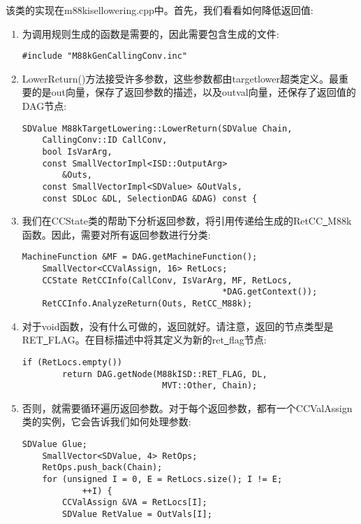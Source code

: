 该类的实现在m88kisellowering.cpp中。首先，我们看看如何降低返回值:\par

\begin{enumerate}
\item 为调用规则生成的函数是需要的，因此需要包含生成的文件:
\begin{lstlisting}[caption={}]
#include "M88kGenCallingConv.inc"
\end{lstlisting}

\item LowerReturn()方法接受许多参数，这些参数都由targetlower超类定义。最重要的是out向量，保存了返回参数的描述，以及outval向量，还保存了返回值的DAG节点:
\begin{lstlisting}[caption={}]
SDValue M88kTargetLowering::LowerReturn(SDValue Chain,
	CallingConv::ID CallConv,
	bool IsVarArg,
	const SmallVectorImpl<ISD::OutputArg>
		&Outs,
	const SmallVectorImpl<SDValue> &OutVals,
	const SDLoc &DL, SelectionDAG &DAG) const {
\end{lstlisting}

\item 我们在CCState类的帮助下分析返回参数，将引用传递给生成的RetCC\underline{~}M88k函数。因此，需要对所有返回参数进行分类:
\begin{lstlisting}[caption={}]
	MachineFunction &MF = DAG.getMachineFunction();
	SmallVector<CCValAssign, 16> RetLocs;
	CCState RetCCInfo(CallConv, IsVarArg, MF, RetLocs,
										*DAG.getContext());
	RetCCInfo.AnalyzeReturn(Outs, RetCC_M88k);
\end{lstlisting}

\item 对于void函数，没有什么可做的，返回就好。请注意，返回的节点类型是RET\underline{~}FLAG。在目标描述中将其定义为新的ret\underline{~}flag节点:
\begin{lstlisting}[caption={}]
	if (RetLocs.empty())
		return DAG.getNode(M88kISD::RET_FLAG, DL,
							MVT::Other, Chain);
\end{lstlisting}

\item 否则，就需要循环遍历返回参数。对于每个返回参数，都有一个CCValAssign类的实例，它会告诉我们如何处理参数:
\begin{lstlisting}[caption={}]
	SDValue Glue;
	SmallVector<SDValue, 4> RetOps;
	RetOps.push_back(Chain);
	for (unsigned I = 0, E = RetLocs.size(); I != E;
			++I) {
		CCValAssign &VA = RetLocs[I];
		SDValue RetValue = OutVals[I];
\end{lstlisting}


\end{enumerate}
